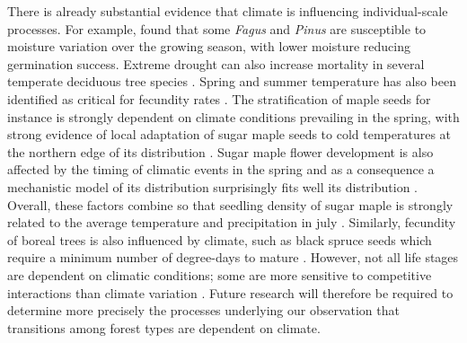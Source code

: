 There is already substantial evidence that climate is influencing individual-scale processes. For
example, \citet{Clark2011} found that some \textit{Fagus} and \textit{Pinus} are susceptible to
moisture variation over the growing season, with lower moisture reducing germination success.
Extreme drought can also increase mortality in several temperate deciduous tree species
\citep{Anderson-Teixeira2013}. Spring and summer temperature has also been identified as critical
for fecundity rates \citep{Clark2011,Graignic2013}. The stratification of maple seeds for instance
is strongly dependent on climate conditions prevailing in the spring, with strong evidence of local
adaptation of sugar maple seeds to cold temperatures at the northern edge of its distribution
\citep{Solarik2016}. Sugar maple flower development is also affected by the timing of climatic
events in the spring \cite{Letters2001} and as a consequence a mechanistic model of its distribution
surprisingly fits well its distribution \citep{Morin2008}.  Overall, these factors combine so that
seedling density of sugar maple is strongly related to the average temperature and precipitation in
july \citep{Graignic2013}. Similarly, fecundity of boreal trees is also influenced by climate, such
as black spruce seeds which require a minimum number of degree-days to mature \citep{Meunier2007}.
However, not all life stages are dependent on climatic conditions; some are more sensitive to
competitive interactions than climate variation \citep{Zhang2015a}. Future research will therefore
be required to determine more precisely the processes underlying our observation that transitions
among forest types are dependent on climate.


